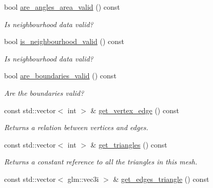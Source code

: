 \begin{DoxyCompactItemize}
\mbox{\label{classgeoproc_1_1TriangleMesh_ad25eb7051e7eac604142d45929f33c19}} 
bool \hyperlink{classgeoproc_1_1TriangleMesh_ad25eb7051e7eac604142d45929f33c19}{are\+\_\+angles\+\_\+area\+\_\+valid} () const
\begin{DoxyCompactList}\small\item\em Is neighbourhood data valid? \end{DoxyCompactList}\item 
\mbox{\label{classgeoproc_1_1TriangleMesh_aa6f95b95709a72a14a15638bfeeed3f9}} 
bool \hyperlink{classgeoproc_1_1TriangleMesh_aa6f95b95709a72a14a15638bfeeed3f9}{is\+\_\+neighbourhood\+\_\+valid} () const
\begin{DoxyCompactList}\small\item\em Is neighbourhood data valid? \end{DoxyCompactList}\item 
\mbox{\label{classgeoproc_1_1TriangleMesh_a409e399857e1a1abc9f23918ff5f5860}} 
bool \hyperlink{classgeoproc_1_1TriangleMesh_a409e399857e1a1abc9f23918ff5f5860}{are\+\_\+boundaries\+\_\+valid} () const
\begin{DoxyCompactList}\small\item\em Are the boundaries valid? \end{DoxyCompactList}\item 
const std\+::vector$<$ int $>$ \& \hyperlink{classgeoproc_1_1TriangleMesh_ae73a760e61250eb2f474b8ab03a1e2ab}{get\+\_\+vertex\+\_\+edge} () const
\begin{DoxyCompactList}\small\item\em Returns a relation between vertices and edges. \end{DoxyCompactList}\item 
const std\+::vector$<$ int $>$ \& \hyperlink{classgeoproc_1_1TriangleMesh_af5093cb9508a1f3193f5b8481bbabef3}{get\+\_\+triangles} () const
\begin{DoxyCompactList}\small\item\em Returns a constant reference to all the triangles in this mesh. \end{DoxyCompactList}\item 
const std\+::vector$<$ glm\+::vec3i $>$ \& \hyperlink{classgeoproc_1_1TriangleMesh_a17d930d9e6f6bc2f996a2128d2a2db01}{get\+\_\+edges\+\_\+triangle} () const

\end{DoxyCompactItemize}
